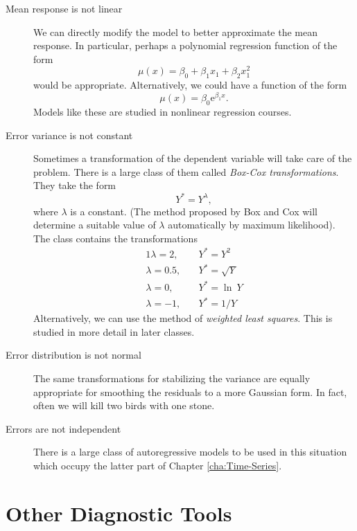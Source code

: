 \documentclass[captions=tableheading]{scrbook}
\begin{document}
\begin{description}
\item[Mean response is not linear] We can directly modify the model to better approximate the mean response. In particular, perhaps a polynomial regression function of the form 
  \[
  \mu(x) = \beta_{0} + \beta_{1}x_{1} + \beta_{2}x_{1}^{2}
  \]
  would be appropriate. Alternatively, we could have a function of the form
  \[
  \mu(x)=\beta_{0}\mathrm{e}^{\beta_{1}x}.
  \]
  Models like these are studied in nonlinear regression courses.
\item[Error variance is not constant] Sometimes a transformation of the dependent variable will take care of the problem. There is a large class of them called \emph{Box-Cox transformations}. They take the form 
  \begin{equation}
  Y^{\ast}=Y^{\lambda},
  \end{equation}
  where \(\lambda\) is a constant. (The method proposed by Box and Cox will determine a suitable value of \(\lambda\) automatically by maximum likelihood). The class contains the transformations 
  \begin{alignat*}{1}
  \lambda=2,\quad & Y^{\ast}=Y^{2}\\
  \lambda=0.5,\quad & Y^{\ast}=\sqrt{Y}\\
  \lambda=0,\quad & Y^{\ast}=\ln\: Y\\
  \lambda=-1,\quad & Y^{\ast}=1/Y
  \end{alignat*}
  Alternatively, we can use the method of \emph{weighted least squares}. This is studied in more detail in later classes.
\item[Error distribution is not normal] The same transformations for stabilizing the variance are equally appropriate for smoothing the residuals to a more Gaussian form. In fact, often we will kill two birds with one stone.
\item[Errors are not independent] There is a large class of autoregressive models to be used in this situation which occupy the latter part of Chapter \ref{cha:Time-Series}.
\end{description}
\section{Other Diagnostic Tools}
\label{sec-11-5}

\label{sec:Other-Diagnostic-Tools-SLR}
\end{document}

